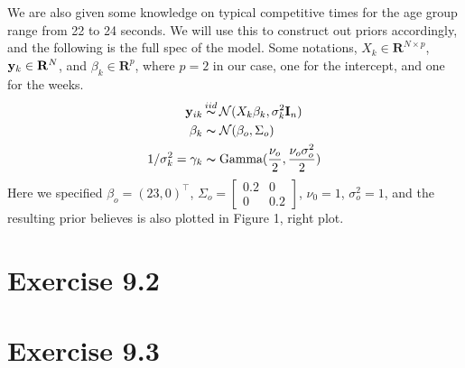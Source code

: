 \documentclass[11pt, letterpaper]{article}
\begin{document}
We are also given some knowledge on typical competitive times for the age group range from 22 to 24 seconds. We will use this to construct out priors accordingly, and the following is the full spec of the model. Some notations, $X_{k} \in \mathbf{R}^{N\times p}$, $\bold{y}_k \in \mathbf{R}^N$, and $\beta_k \in \mathbf{R}^p$, where $p = 2$ in our case, one for the intercept, and one for the weeks.
\begin{align*}
    \bold{y}_{ik} &\mathop{\thicksim}^{iid} \mathcal{N}(X_k \beta_k, \sigma_k^2 \mathbf{I}_n) \\
    \beta_k &\thicksim \mathcal{N}(\beta_o, \Sigma_o) \\
    1/\sigma^2_k = \gamma_k &\thicksim \text{Gamma}(\frac{\nu_o}{2}, \frac{\nu_o\sigma^2_o}{2})
\end{align*}
Here we specified $\beta_o = (23, 0)^{\intercal}$, $\Sigma_o = \begin{bmatrix}0.2 & 0 \\ 0 & 0.2\end{bmatrix}$, $\nu_0 = 1$, $\sigma^2_o = 1$, and the resulting prior believes is also plotted in Figure 1, right plot.


\section{Exercise 9.2}
\section{Exercise 9.3}
\end{document}
